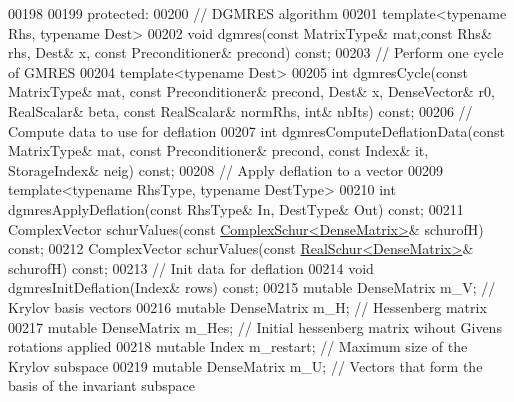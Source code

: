 \begin{DoxyCode}
00198   
00199   \textcolor{keyword}{protected}:
00200     \textcolor{comment}{// DGMRES algorithm }
00201     \textcolor{keyword}{template}<\textcolor{keyword}{typename} Rhs, \textcolor{keyword}{typename} Dest>
00202     \textcolor{keywordtype}{void} dgmres(\textcolor{keyword}{const} MatrixType& mat,\textcolor{keyword}{const} Rhs& rhs, Dest& x, \textcolor{keyword}{const} Preconditioner& precond) \textcolor{keyword}{const};
00203     \textcolor{comment}{// Perform one cycle of GMRES}
00204     \textcolor{keyword}{template}<\textcolor{keyword}{typename} Dest>
00205     \textcolor{keywordtype}{int} dgmresCycle(\textcolor{keyword}{const} MatrixType& mat, \textcolor{keyword}{const} Preconditioner& precond, Dest& x, DenseVector& r0, 
      RealScalar& beta, \textcolor{keyword}{const} RealScalar& normRhs, \textcolor{keywordtype}{int}& nbIts) \textcolor{keyword}{const}; 
00206     \textcolor{comment}{// Compute data to use for deflation }
00207     \textcolor{keywordtype}{int} dgmresComputeDeflationData(\textcolor{keyword}{const} MatrixType& mat, \textcolor{keyword}{const} Preconditioner& precond, \textcolor{keyword}{const} Index& it, 
      StorageIndex& neig) \textcolor{keyword}{const};
00208     \textcolor{comment}{// Apply deflation to a vector}
00209     \textcolor{keyword}{template}<\textcolor{keyword}{typename} RhsType, \textcolor{keyword}{typename} DestType>
00210     \textcolor{keywordtype}{int} dgmresApplyDeflation(\textcolor{keyword}{const} RhsType& In, DestType& Out) \textcolor{keyword}{const}; 
00211     ComplexVector schurValues(\textcolor{keyword}{const} \hyperlink{group___eigenvalues___module_class_eigen_1_1_complex_schur}{ComplexSchur<DenseMatrix>}& schurofH) \textcolor{keyword}{const};
00212     ComplexVector schurValues(\textcolor{keyword}{const} \hyperlink{group___eigenvalues___module_class_eigen_1_1_real_schur}{RealSchur<DenseMatrix>}& schurofH) \textcolor{keyword}{const};
00213     \textcolor{comment}{// Init data for deflation}
00214     \textcolor{keywordtype}{void} dgmresInitDeflation(Index& rows) \textcolor{keyword}{const}; 
00215     \textcolor{keyword}{mutable} DenseMatrix m\_V; \textcolor{comment}{// Krylov basis vectors}
00216     \textcolor{keyword}{mutable} DenseMatrix m\_H; \textcolor{comment}{// Hessenberg matrix }
00217     \textcolor{keyword}{mutable} DenseMatrix m\_Hes; \textcolor{comment}{// Initial hessenberg matrix wihout Givens rotations applied}
00218     \textcolor{keyword}{mutable} Index m\_restart; \textcolor{comment}{// Maximum size of the Krylov subspace}
00219     \textcolor{keyword}{mutable} DenseMatrix m\_U; \textcolor{comment}{// Vectors that form the basis of the invariant subspace }

\end{DoxyCode}
